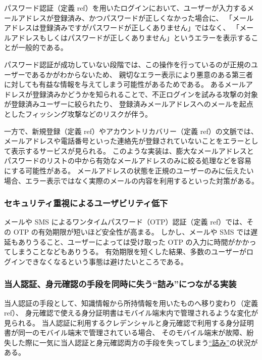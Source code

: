 \documentclass[uplatex]{jsarticle}
\def\ref#1{ref}%
\def\label#1{}%
\begin{document}
\begin{exa}[ログイン時のエラー表示]\label{exa:ch5-login-error-message}
パスワード認証（定義 \ref{dfn:password-auth}）を用いたログインにおいて、ユーザーが入力するメールアドレスが登録済み、かつパスワードが正しくなかった場合に、
「メールアドレスは登録済みですがパスワードが正しくありません」ではなく、
「メールアドレスもしくはパスワードが正しくありません」というエラーを表示することが一般的である。
\end{exa}

パスワード認証が成功していない段階では、この操作を行っているのが正規のユーザーであるかがわからないため、
親切なエラー表示により悪意のある第三者に対しても有益な情報を与えてしまう可能性があるためである。
あるメールアドレスが登録済みかどうかを知られることで、不正ログインを試みる攻撃の対象が登録済みユーザーに絞られたり、
登録済みメールアドレスへのメールを起点としたフィッシング攻撃などのリスクが伴う。

\begin{rem}\label{rem:ch5-signup-recovery-error}
一方で、新規登録（定義 \ref{dfn:signup}）やアカウントリカバリー（定義 \ref{dfn:account-recovery}）の文脈では、
メールアドレスや電話番号といった連絡先が登録されていないことをエラーとして表示するサービスが見られる。
このような実装は、膨大なメールアドレスとパスワードのリストの中から有効なメールアドレスのみに絞る処理などを容易にする可能性がある。
メールアドレスの状態を正規のユーザーのみに伝えたい場合、エラー表示ではなく実際のメールの内容を利用するといった対策がある。
\end{rem}

\subsubsection{セキュリティ重視によるユーザビリティ低下}

メールや SMS によるワンタイムパスワード（OTP）認証（定義 \ref{dfn:otp-auth}）では、その OTP の有効期限が短いほど安全性が高まる。
しかし、メールや SMS では遅延もありうること、ユーザーによっては受け取った OTP の入力に時間がかかってしまうことなどもありうる。
有効期限を短くした結果、多数のユーザーがログインできなくなるという事態は避けたいところである。

\subsubsection{当人認証、身元確認の手段を同時に失う“詰み”につながる実装}

当人認証の手段として、知識情報から所持情報を用いたものへ移り変わり（定義 \ref{dfn:authentication-factors}）、
身元確認で使える身分証明書はモバイル端末内で管理されるような変化が見られる。
当人認証に利用するクレデンシャルと身元確認で利用する身分証明書が同一のモバイル端末で管理されている場合、
そのモバイル端末が故障、紛失した際に一気に当人認証と身元確認両方の手段を失ってしまう\underline{“詰み”}の状況がある。
\end{document}
